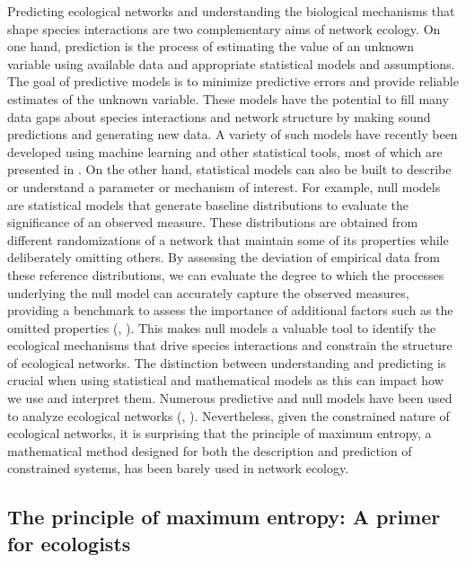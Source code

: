 Predicting ecological networks and understanding the biological mechanisms that
shape species interactions are two complementary aims of network ecology. On one
hand, prediction is the process of estimating the value of an unknown variable
using available data and appropriate statistical models and assumptions. The
goal of predictive models is to minimize predictive errors and provide reliable
estimates of the unknown variable. These models have the potential to fill many
data gaps about species interactions and network structure by making sound
predictions and generating new data. A variety of such models have recently been
developed using machine learning and other statistical tools, most of which are
presented in \textcite{Strydom2021Roadmapa}. On the other hand, statistical models can
also be built to describe or understand a parameter or mechanism of interest.
For example, null models are statistical models that generate baseline
distributions to evaluate the significance of an observed measure. These
distributions are obtained from different randomizations of a network that
maintain some of its properties while deliberately omitting others. By assessing
the deviation of empirical data from these reference distributions, we can
evaluate the degree to which the processes underlying the null model can
accurately capture the observed measures, providing a benchmark to assess the
importance of additional factors such as the omitted properties
(\cite{Fortuna2006Habitat}, \cite{Delmas2019Analysing}). This makes null models a
valuable tool to identify the ecological mechanisms that drive species
interactions and constrain the structure of ecological networks. The distinction
between understanding and predicting is crucial when using statistical and
mathematical models as this can impact how we use and interpret them. Numerous
predictive and null models have been used to analyze ecological networks
(\cite{Delmas2019Analysing}, \cite{Strydom2021Roadmapa}). Nevertheless, given the
constrained nature of ecological networks, it is surprising that the principle
of maximum entropy, a mathematical method designed for both the description and
prediction of constrained systems, has been barely used in network ecology. 

\subsection{The principle of maximum entropy: A primer for ecologists}

